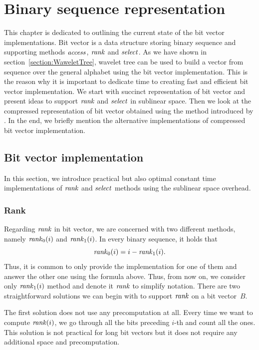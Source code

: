 \chapter{Binary sequence representation}
\label{kap:kap2}

This chapter is dedicated to outlining the current state of the bit vector
implementations. Bit vector is a data structure storing binary sequence and supporting
methods $\mathit{access}$, $\mathit{rank}$ and $\mathit{select}$. As we have shown in section~\ref{section:WaweletTree},
wavelet tree can be used to build a vector from sequence over the general alphabet
using the bit vector implementation. This is the reason why it is important to dedicate
time to creating fast and efficient bit vector implementation. We start with succinct
representation of bit vector and present ideas to support $\mathit{rank}$ and $\mathit{select}$ in sublinear
space. Then we look at the compressed representation of bit vector obtained using the method
introduced by \cite{raman2007succinct}. In the end, we briefly mention the alternative implementations
of compressed bit vector implementation.

\section{Bit vector implementation}

In this section, we introduce practical but also optimal constant time implementations of
$\mathit{rank}$ and $\mathit{select}$ methods using the sublinear space overhead.

\subsection{Rank}
\label{section:rank}

Regarding $\mathit{rank}$ in bit vector, we are concerned with two different methods, namely $\mathit{rank}_0(i)$
and $\mathit{rank}_1(i)$. In every binary sequence, it holds that $$\mathit{rank}_0(i) = i - \mathit{rank}_1(i).$$
Thus, it is common to only provide the implementation for one of them and answer the other one
using the formula above. Thus, from now on, we consider only $\mathit{rank}_1(i)$ method and denote
it $\mathit{rank}$ to simplify notation. There are two straightforward solutions we can begin with to
support $\mathit{rank}$ on a bit vector~$B$.

The first solution does not use any precomputation at all. Every time we want
to compute $\mathit{rank}(i)$, we go through all the bits preceding $i$-th and count all
the ones. This solution is not practical for long bit vectors but it does not require
any additional space and precomputation.


